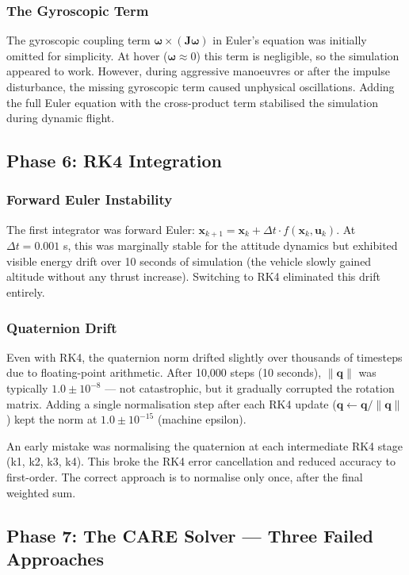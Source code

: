 \documentclass[12pt, a4paper]{article}
\newcommand{\bx}{\bm{x}}
\newcommand{\bu}{\bm{u}}
\newcommand{\bq}{\bm{q}}
\newcommand{\bomega}{\bm{\omega}}
\newcommand{\bJ}{\bm{J}}
\begin{document}
\subsubsection{The Gyroscopic Term}

The gyroscopic coupling term $\bomega \times (\bJ \bomega)$ in Euler's equation was initially omitted for simplicity.  At hover ($\bomega \approx 0$) this term is negligible, so the simulation appeared to work.  However, during aggressive manoeuvres or after the impulse disturbance, the missing gyroscopic term caused unphysical oscillations.  Adding the full Euler equation with the cross-product term stabilised the simulation during dynamic flight.

\subsection{Phase 6: RK4 Integration}

\subsubsection{Forward Euler Instability}

The first integrator was forward Euler: $\bx_{k+1} = \bx_k + \Delta t \cdot f(\bx_k, \bu_k)$.  At $\Delta t = 0.001$ s, this was marginally stable for the attitude dynamics but exhibited visible energy drift over 10 seconds of simulation (the vehicle slowly gained altitude without any thrust increase).  Switching to RK4 eliminated this drift entirely.

\subsubsection{Quaternion Drift}

Even with RK4, the quaternion norm drifted slightly over thousands of timesteps due to floating-point arithmetic.  After 10{,}000 steps (10 seconds), $\|\bq\|$ was typically $1.0 \pm 10^{-8}$ --- not catastrophic, but it gradually corrupted the rotation matrix.  Adding a single normalisation step after each RK4 update ($\bq \leftarrow \bq / \|\bq\|$) kept the norm at $1.0 \pm 10^{-15}$ (machine epsilon).

An early mistake was normalising the quaternion at each intermediate RK4 stage (k1, k2, k3, k4).  This broke the RK4 error cancellation and reduced accuracy to first-order.  The correct approach is to normalise only once, after the final weighted sum.

\subsection{Phase 7: The CARE Solver --- Three Failed Approaches}
\end{document}
